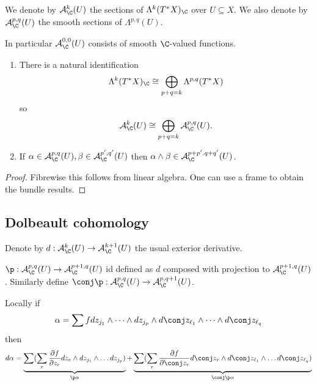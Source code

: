 \documentclass[a4paper]{article}
\newcommand{\w}{\wedge} %
\begin{document}
\begin{definition}
  We denote by \(\mathcal A_\C^k(U)\) the sections of \(\Lambda^k(T^*X)_\C\) over \(U \subseteq X\). We also denote by \(\mathcal A_\C^{p, q}(U)\) the smooth sections of \(\Lambda^{p, q}(U)\).
\end{definition}
In particular \(\mathcal A_\C^{0, 0}(U)\) consists of smooth \(\C\)-valued functions.

\begin{lemma}\leavevmode
  \begin{enumerate}
  \item There is a natural identification
    \[
      \Lambda^k(T^*X)_\C \cong \bigoplus_{p + q = k} \Lambda^{p, q} (T^*X)
    \]
    so
    \[
      \mathcal A_\C^k(U) \cong \bigoplus_{p + q = k} \mathcal A_\C^{p, q} (U).
    \]
  \item If \(\alpha \in \mathcal A_\C^{p, q}(U), \beta \in \mathcal A_\C^{p', q'}(U)\) then \(\alpha \w \beta \in \mathcal A_\C^{p + p', q + q'}(U)\).
  \end{enumerate}
\end{lemma}

\begin{proof}
  Fibrewise this follows from linear algebra. One can use a frame to obtain the bundle results.
\end{proof}

\subsection{Dolbeault cohomology}

Denote by \(d: \mathcal A_\C^k(U) \to \mathcal A_\C^{k + 1}(U)\) the usual exterior derivative.

\begin{definition}
  \(\p: \mathcal A_\C^{p, q}(U) \to \mathcal A_\C^{p + 1, q}(U)\) id defined as \(d\) composed with projection to \(\mathcal A_\C^{p + 1, q}(U)\). Similarly define \(\conj \p: \mathcal A_\C^{p, q}(U) \to \mathcal A_\C^{p, q + 1}(U)\).
\end{definition}

Locally if
\[
  \alpha = \sum fdz_{j_1} \w \dots \w dz_{j_p} \w d \conj z_{\ell_1} \w \dots \w d \conj z_{\ell_q}
\]
then
\[
  d \alpha = \underbrace{\sum (\sum_r \frac{\partial f}{\partial z_r} dz_r \w dz_{j_1} \w \dots dz_{j_p})}_{\p \alpha} + \underbrace{\sum (\sum_r \frac{\partial f}{\partial \conj z_r} d\conj z_r \w d\conj z_{\ell_1} \w \dots d \conj z_{\ell_q})}_{\conj \p \alpha}
\]
\end{document}
